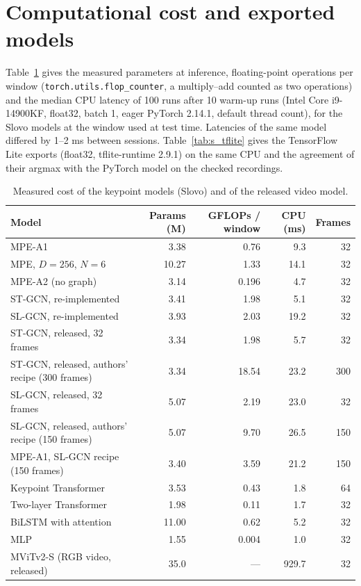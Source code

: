 \documentclass[a4paper,10pt]{article}
\begin{document}
\section{Computational cost and exported models}
Table~\ref{tab:s_cost} gives the measured parameters at inference, floating-point operations per window (\texttt{torch.utils.flop\_counter}, a multiply--add counted as two operations) and the median CPU latency of 100 runs after 10 warm-up runs (Intel Core i9-14900KF, float32, batch 1, eager PyTorch 2.14.1, default thread count), for the Slovo models at the window used at test time. Latencies of the same model differed by 1--2 ms between sessions. Table~\ref{tab:s_tflite} gives the TensorFlow Lite exports (float32, tflite-runtime 2.9.1) on the same CPU and the agreement of their argmax with the PyTorch model on the checked recordings.
\begin{table}[H]
\caption{Measured cost of the keypoint models (Slovo) and of the released video model.}\label{tab:s_cost}
\centering
\footnotesize
\begin{tabular}{lrrrr}
\toprule
\textbf{Model} & \textbf{Params (M)} & \textbf{GFLOPs / window} & \textbf{CPU (ms)} & \textbf{Frames} \\
\midrule
MPE-A1 & 3.38 & 0.76 & 9.3 & 32 \\
MPE, $D = 256$, $N = 6$ & 10.27 & 1.33 & 14.1 & 32 \\
MPE-A2 (no graph) & 3.14 & 0.196 & 4.7 & 32 \\
ST-GCN, re-implemented & 3.41 & 1.98 & 5.1 & 32 \\
SL-GCN, re-implemented & 3.93 & 2.03 & 19.2 & 32 \\
ST-GCN, released, 32 frames & 3.34 & 1.98 & 5.7 & 32 \\
ST-GCN, released, authors' recipe (300 frames) & 3.34 & 18.54 & 23.2 & 300 \\
SL-GCN, released, 32 frames & 5.07 & 2.19 & 23.0 & 32 \\
SL-GCN, released, authors' recipe (150 frames) & 5.07 & 9.70 & 26.5 & 150 \\
MPE-A1, SL-GCN recipe (150 frames) & 3.40 & 3.59 & 21.2 & 150 \\
Keypoint Transformer & 3.53 & 0.43 & 1.8 & 64 \\
Two-layer Transformer & 1.98 & 0.11 & 1.7 & 32 \\
BiLSTM with attention & 11.00 & 0.62 & 5.2 & 32 \\
MLP & 1.55 & 0.004 & 1.0 & 32 \\
MViTv2-S (RGB video, released) & 35.0 & --- & 929.7 & 32 \\
\bottomrule
\end{tabular}
\end{table}
\end{document}
